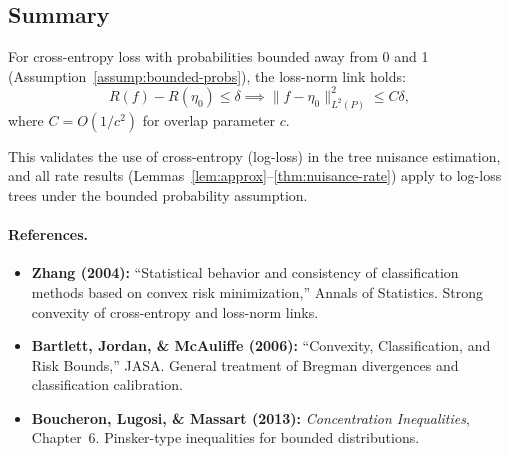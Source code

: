 \documentclass[12pt]{article}
\begin{document}
\subsection{Summary}

For cross-entropy loss with probabilities bounded away from 0 and 1 (Assumption~\ref{assump:bounded-probs}), the loss-norm link holds:
\[
R(f) - R(\eta_0) \le \delta \implies \|f - \eta_0\|_{L^2(P)}^2 \le C\delta,
\]
where $C = O(1/c^2)$ for overlap parameter $c$.

This validates the use of cross-entropy (log-loss) in the tree nuisance estimation, and all rate results (Lemmas~\ref{lem:approx}--\ref{thm:nuisance-rate}) apply to log-loss trees under the bounded probability assumption.

\paragraph{References.}
\begin{itemize}
\item \textbf{Zhang (2004):} ``Statistical behavior and consistency of classification methods based on convex risk minimization,'' Annals of Statistics. Strong convexity of cross-entropy and loss-norm links.
\item \textbf{Bartlett, Jordan, \& McAuliffe (2006):} ``Convexity, Classification, and Risk Bounds,'' JASA. General treatment of Bregman divergences and classification calibration.
\item \textbf{Boucheron, Lugosi, \& Massart (2013):} \emph{Concentration Inequalities}, Chapter~6. Pinsker-type inequalities for bounded distributions.
\end{itemize}




\end{document}
